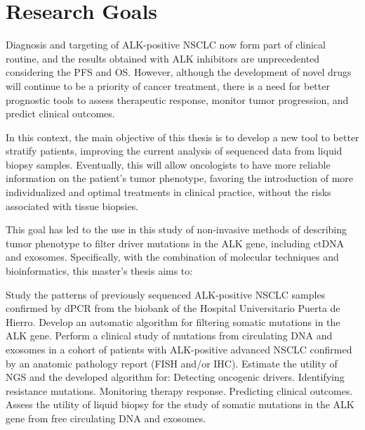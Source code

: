 \chapter{Research Goals}

Diagnosis and targeting of ALK-positive NSCLC now form part of clinical routine, and the results obtained with ALK inhibitors are unprecedented considering the PFS and OS. However, although the development of novel drugs will continue to be a priority of cancer treatment, there is a need for better prognostic tools to assess therapeutic response, monitor tumor progression, and predict clinical outcomes.

In this context, the main objective of this thesis is to develop a new tool to better stratify patients, improving the current analysis of sequenced data from liquid biopsy samples. Eventually, this will allow oncologists to have more reliable information on the patient's tumor phenotype, favoring the introduction of more individualized and optimal treatments in clinical practice, without the risks associated with tissue biopsies.

This goal has led to the use in this study of non-invasive methods of describing tumor phenotype to filter driver mutations in the ALK gene, including ctDNA and exosomes. Specifically, with the combination of molecular techniques and bioinformatics, this master's thesis aims to:
\begin{outline}
    \1 Study the patterns of previously sequenced ALK-positive NSCLC samples confirmed by dPCR from the biobank of the Hospital Universitario Puerta de Hierro.
    \1 Develop an automatic algorithm for filtering somatic mutations in the ALK gene.
    \1 Perform a clinical study of mutations from circulating DNA and exosomes in a cohort of patients with ALK-positive advanced NSCLC confirmed by an anatomic pathology report (FISH and\slash or IHC).
    \1 Estimate the utility of NGS and the developed algorithm for:
        \2 Detecting oncogenic drivers.
        \2 Identifying resistance mutations.
        \2 Monitoring therapy response.
        \2 Predicting clinical outcomes.
    \1 Assess the utility of liquid biopsy for the study of somatic mutations in the ALK gene from free circulating DNA and exosomes.
\end{outline}